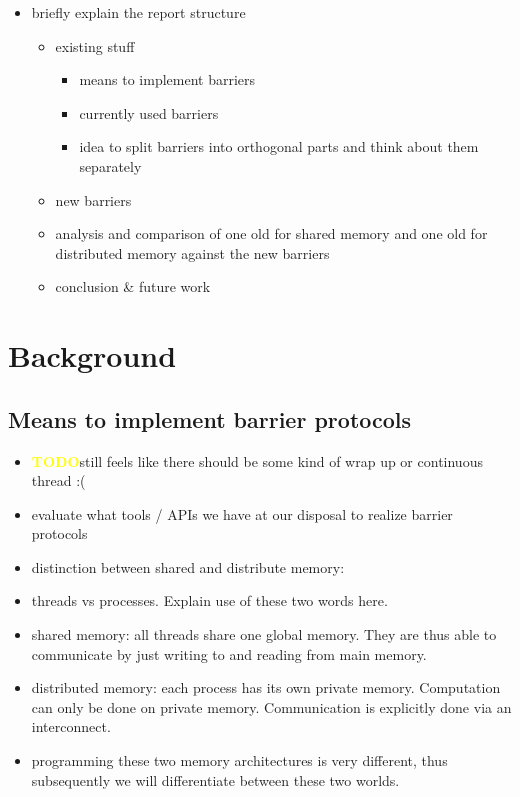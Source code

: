 \documentclass[a4paper, 10pt]{article}
\def \todo{\textbf{\textcolor{yellow}{TODO}}}
\begin{document}
\begin{enumerate}
\begin{itemize}
\begin{itemize}
		\end{itemize}
	\item briefly explain the report structure
		\begin{itemize}
			\item existing stuff
				\begin{itemize}
					\item means to implement barriers
					\item currently used barriers
					\item idea to split barriers into orthogonal parts and think about them separately
				\end{itemize}
			\item new barriers
			\item analysis and comparison of one old for shared memory and one old for distributed memory against the new barriers
			\item conclusion \& future work
		\end{itemize}
\end{itemize}

\section{Background}
\label{sec:existing}

\subsection{Means to implement barrier protocols}
\label{ssec:existing-means}
\begin{itemize}
	\item \todo still feels like there should be some kind of wrap up or continuous thread :(
	\item evaluate what tools / APIs we have at our disposal to realize barrier protocols
	\item distinction between shared and distribute memory:
	\item threads vs processes. Explain use of these two words here.
	\item shared memory: all threads share one global memory. They are thus able to communicate by just writing to and reading from main memory.
	\item distributed memory: each process has its own private memory. Computation can only be done on private memory. Communication is explicitly done via an interconnect.
	\item programming these two memory architectures is very different, thus subsequently we will differentiate between these two worlds.
\end{itemize}


\end{enumerate}
\end{document}
